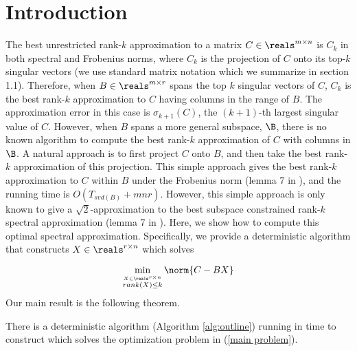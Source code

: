 \section{Introduction}
The best unrestricted rank-$k$ approximation to a matrix $C \in \reals^{m \times n}$ is $C_k$ in both spectral and Frobenius norms, where $C_k$ is the projection of $C$ onto its top-$k$ singular vectors (we use standard matrix notation which we summarize in section 1.1). Therefore, when $B \in \reals^{m \times r}$ spans the top $k$ singular vectors of $C$, $C_k$ is the best rank-$k$ approximation to $C$ having columns in the range of $B$. The approximation error in this case is $\sigma_{k+1}(C)$, the $(k+1)$-th largest singular value of $C$. 
However, when $B$ spans a more general subspace, $\B$, there is no known algorithm to compute the best rank-$k$ approximation of $C$ with columns in $\B$. A natural approach is to first project $C$ onto $B$, and then take the best rank-$k$ approximation of this projection. This simple approach gives the best rank-$k$ approximation to $C$ within $B$ under the Frobenius norm (lemma 7 in \cite{BDM}), and the running time is $O(T_{svd(B)}+ mnr)$.  However, this simple approach is only 
known to give a $\sqrt{2}$-approximation to the best subspace constrained rank-$k$ spectral approximation (lemma 7 in \cite{BDM}). 
Here, we show how to compute this optimal spectral approximation. Specifically, we provide a deterministic algorithm that constructs $X \in \reals^{r \times n}$ which solves

\begin{equation}\label{main problem}
\min_{\stackrel{X \in  \reals^{r \times n}}{rank({X}) \leq k}} \norm{{C} - {BX}}
\end{equation}
Our main result is the following theorem.
\begin{theorem}\label{thm:main}
There is a deterministic algorithm (Algorithm \ref{alg:outline})
 running in time
 to construct  which solves the optimization
problem in (\ref{main problem}).
\end{theorem}
